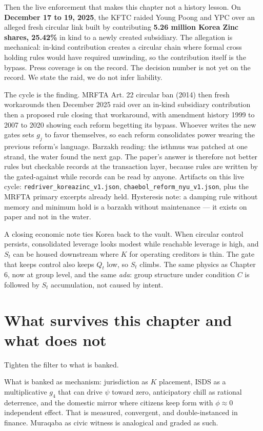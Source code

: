 Then the live enforcement that makes this chapter not a history lesson. On \textbf{December 17 to 19, 2025}, the KFTC raided Young Poong and YPC over an alleged fresh circular link built by contributing \textbf{5.26 million Korea Zinc shares, 25.42\%} in kind to a newly created subsidiary. The allegation is mechanical: in-kind contribution creates a circular chain where formal cross holding rules would have required unwinding, so the contribution itself is the bypass. Press coverage is on the record. The decision number is not yet on the record. We state the raid, we do not infer liability.

The cycle is the finding. MRFTA Art. 22 circular ban (2014) then fresh workarounds then December 2025 raid over an in-kind subsidiary contribution then a proposed rule closing that workaround, with amendment history 1999 to 2007 to 2020 showing each reform begetting its bypass. Whoever writes the new gates sets $g_j$ to favor themselves, so each reform consolidates power wearing the previous reform's language. Barzakh reading: the isthmus was patched at one strand, the water found the next gap. The paper's answer is therefore not better rules but checkable records at the transaction layer, because rules are written by the gated-against while records can be read by anyone. Artifacts on this live cycle: \texttt{redriver\_koreazinc\_v1.json}, \texttt{chaebol\_reform\_nyu\_v1.json}, plus the MRFTA primary excerpts already held. Hysteresis note: a damping rule without memory and minimum hold is a barzakh without maintenance --- it exists on paper and not in the water.

A closing economic note ties Korea back to the vault. When circular control persists, consolidated leverage looks modest while reachable leverage is high, and $S_t$ can be housed downstream where $K$ for operating creditors is thin. The gate that keeps control also keeps $Q_t$ low, so $S_t$ climbs. The same physics as Chapter 6, now at group level, and the same \textit{ada}: group structure under condition $C$ is followed by $S_t$ accumulation, not caused by intent.

\section{What survives this chapter and what does not}

Tighten the filter to what is banked.

What is banked as mechanism: jurisdiction as $K$ placement, ISDS as a multiplicative $g_4$ that can drive $\psi$ toward zero, anticipatory chill as rational deterrence, and the domestic mirror where citizens keep form with $\phi \approx 0$ independent effect. That is measured, convergent, and double-instanced in finance. Muraqaba as civic witness is analogical and graded as such.


